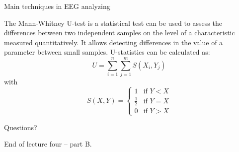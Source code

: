 \documentclass{beamer}
\begin{document}
\begin{frame}
{\centerline{Main techniques in EEG analyzing}}

The Mann-Whitney U-test is a statistical test can be used to assess the differences between two independent samples on the level of a characteristic measured quantitatively. It allows detecting differences in the value of a parameter between small samples. U-statistics can be calculated as:
\begin{equation}
    U=\sum_{i=1}^{n}\sum_{j=1}^{m} S(X_{i}, Y_{j})
\end{equation}
with 
\begin{equation}
    S(X,Y)=
    \begin{cases}
        1 & \text{if $Y<X$} \\
        \frac{1}{2} & \text{if $Y=X$} \\
        0 & \text{if $Y>X$}
    \end{cases}
\end{equation}
    
\end{frame}


\begin{frame}
{\centerline{Questions?}}
\begin{center}
    \vspace{2cm}
    \LARGE End of lecture four -- part B.
\end{center}

\end{frame}
\end{document}
